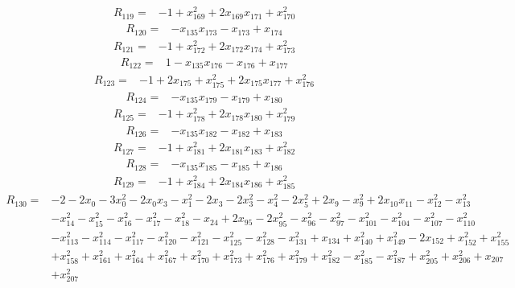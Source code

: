 \begin{align*}
R_{119}={}&-1+x_{169}^{2}+2x_{169}x_{171}+x_{170}^{2}
\end{align*}
\begin{align*}
R_{120}={}&-x_{135}x_{173}-x_{173}+x_{174}
\end{align*}
\begin{align*}
R_{121}={}&-1+x_{172}^{2}+2x_{172}x_{174}+x_{173}^{2}
\end{align*}
\begin{align*}
R_{122}={}&1-x_{135}x_{176}-x_{176}+x_{177}
\end{align*}
\begin{align*}
R_{123}={}&-1+2x_{175}+x_{175}^{2}+2x_{175}x_{177}+x_{176}^{2}
\end{align*}
\begin{align*}
R_{124}={}&-x_{135}x_{179}-x_{179}+x_{180}
\end{align*}
\begin{align*}
R_{125}={}&-1+x_{178}^{2}+2x_{178}x_{180}+x_{179}^{2}
\end{align*}
\begin{align*}
R_{126}={}&-x_{135}x_{182}-x_{182}+x_{183}
\end{align*}
\begin{align*}
R_{127}={}&-1+x_{181}^{2}+2x_{181}x_{183}+x_{182}^{2}
\end{align*}
\begin{align*}
R_{128}={}&-x_{135}x_{185}-x_{185}+x_{186}
\end{align*}
\begin{align*}
R_{129}={}&-1+x_{184}^{2}+2x_{184}x_{186}+x_{185}^{2}
\end{align*}
\begin{align*}
R_{130}={}&-2-2x_{0}-3x_{0}^{2}-2x_{0}x_{3}-x_{1}^{2}-2x_{3}-2x_{3}^{2}-x_{4}^{2}-2x_{5}^{2}+2x_{9}-x_{9}^{2}+2x_{10}x_{11}-x_{12}^{2}-x_{13}^{2}\\
{}&-x_{14}^{2}-x_{15}^{2}-x_{16}^{2}-x_{17}^{2}-x_{18}^{2}-x_{24}+2x_{95}-2x_{95}^{2}-x_{96}^{2}-x_{97}^{2}-x_{101}^{2}-x_{104}^{2}-x_{107}^{2}-x_{110}^{2}\\
{}&-x_{113}^{2}-x_{114}^{2}-x_{117}^{2}-x_{120}^{2}-x_{121}^{2}-x_{125}^{2}-x_{128}^{2}-x_{131}^{2}+x_{134}+x_{140}^{2}+x_{149}^{2}-2x_{152}+x_{152}^{2}+x_{155}^{2}\\
{}&+x_{158}^{2}+x_{161}^{2}+x_{164}^{2}+x_{167}^{2}+x_{170}^{2}+x_{173}^{2}+x_{176}^{2}+x_{179}^{2}+x_{182}^{2}-x_{185}^{2}-x_{187}^{2}+x_{205}^{2}+x_{206}^{2}+x_{207}\\
{}&+x_{207}^{2}
\end{align*}
